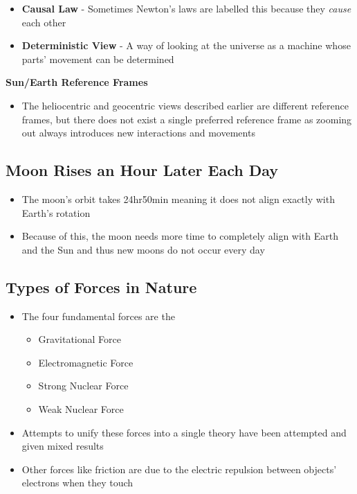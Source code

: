\begin{itemize}
    \item \textbf{Causal Law} - Sometimes Newton's laws are labelled this because they \emph{cause} each other
    \item \textbf{Deterministic View} - A way of looking at the universe as a machine whose parts' movement can be determined
\end{itemize}
\textbf{Sun/Earth Reference Frames}
\begin{itemize}
    \item The heliocentric and geocentric views described earlier are different reference frames, but there does not exist a single preferred reference frame as zooming out always introduces new interactions and movements
\end{itemize}

\subsection{Moon Rises an Hour Later Each Day}
\begin{itemize}
    \item The moon's orbit takes 24hr50min meaning it does not align exactly with Earth's rotation
    \item Because of this, the moon needs more time to completely align with Earth and the Sun and thus new moons do not occur every day
\end{itemize}

\subsection{Types of Forces in Nature}
\begin{itemize}
    \item The four fundamental forces are the
    \begin{itemize}
        \item Gravitational Force
        \item Electromagnetic Force
        \item Strong Nuclear Force
        \item Weak Nuclear Force
    \end{itemize}
    \item Attempts to unify these forces into a single theory have been attempted and given mixed results
    \item Other forces like friction are due to the electric repulsion between objects' electrons when they touch
\end{itemize}

\newpage